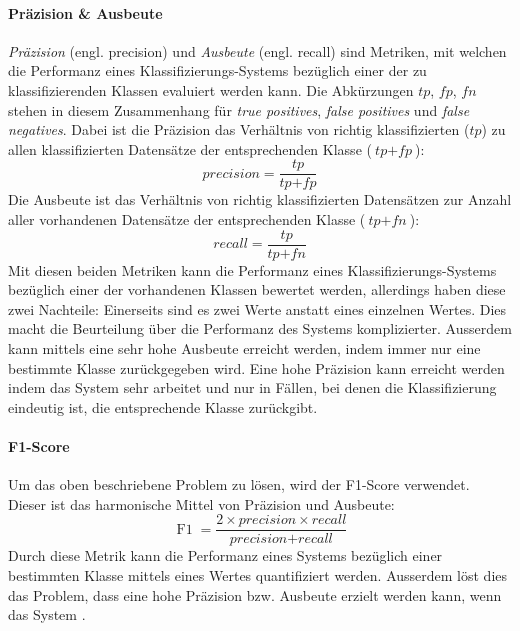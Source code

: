 \paragraph{Präzision {\&} Ausbeute} \emph{Präzision} (engl. precision) und \emph{Ausbeute} (engl. recall) sind Metriken, mit welchen die Performanz eines Klassifizierungs-Systems bezüglich einer der zu klassifizierenden Klassen evaluiert werden kann. Die Abkürzungen $\textit{tp}$, $\textit{fp}$, $\textit{fn}$ stehen in diesem Zusammenhang für \emph{true positives}, \emph{false positives} und \emph{false negatives}. Dabei ist die Präzision das Verhältnis von richtig klassifizierten ($\textit{tp}$) zu allen klassifizierten Datensätze der entsprechenden Klasse ($\textit{tp} + \textit{fp}$):
\begin{equation}
\textit{precision} = \frac{\textit{tp}}{\textit{tp} + \textit{fp}}
\end{equation}
Die Ausbeute ist das Verhältnis von richtig klassifizierten Datensätzen zur Anzahl aller vorhandenen Datensätze der entsprechenden Klasse ($\textit{tp} + \textit{fn}$):
\begin{equation}
\textit{recall} = \frac{\textit{tp}}{\textit{tp} + \textit{fn}}
\end{equation}
Mit diesen beiden Metriken kann die Performanz eines Klassifizierungs-Systems bezüglich einer der vorhandenen Klassen bewertet werden, allerdings haben diese zwei Nachteile: Einerseits sind es zwei Werte anstatt eines einzelnen Wertes. Dies macht die Beurteilung über die Performanz des Systems komplizierter. Ausserdem kann mittels  eine sehr hohe Ausbeute erreicht werden, indem immer nur eine bestimmte Klasse zurückgegeben wird. Eine hohe Präzision kann erreicht werden indem das System sehr  arbeitet und nur in Fällen, bei denen die Klassifizierung eindeutig ist, die entsprechende Klasse zurückgibt.
\paragraph{F1-Score} Um das oben beschriebene Problem zu lösen, wird der F1-Score verwendet. Dieser ist das harmonische Mittel von Präzision und Ausbeute:
\begin{equation}
\label{basic:metrics:f1_eq}
\operatorname{F1} = \frac{2 \times \textit{precision} \times recall}{\textit{precision} + \textit{recall}}
\end{equation}
Durch diese Metrik kann die Performanz eines Systems bezüglich einer bestimmten Klasse mittels eines Wertes quantifiziert werden. Ausserdem löst dies das Problem, dass eine hohe Präzision bzw. Ausbeute erzielt werden kann, wenn das System .
